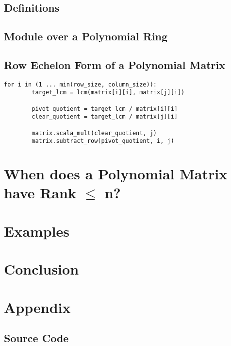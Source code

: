 \documentclass{amsart}
\theoremstyle{definition}
\theoremstyle{remark}
\numberwithin{equation}{section}
\begin{document}
\subsection{Definitions}

\subsection{Module over a Polynomial Ring}

\subsection{Row Echelon Form of a Polynomial Matrix}

\begin{lstlisting}[caption=Computing the Row Echelon Form of a Polynomial Matrix]
    for i in (1 ... min(row_size, column_size)):
        target_lcm = lcm(matrix[i][i], matrix[j][i])

        pivot_quotient = target_lcm / matrix[i][i]
        clear_quotient = target_lcm / matrix[j][i]

        matrix.scala_mult(clear_quotient, j)
        matrix.subtract_row(pivot_quotient, i, j)
\end{lstlisting}

\section{When does a Polynomial Matrix have Rank $\leq$ n?}

\section{Examples}

\section{Conclusion}

\section*{Appendix}

\subsection*{Source Code}

\leavevmode \\

\end{document}
